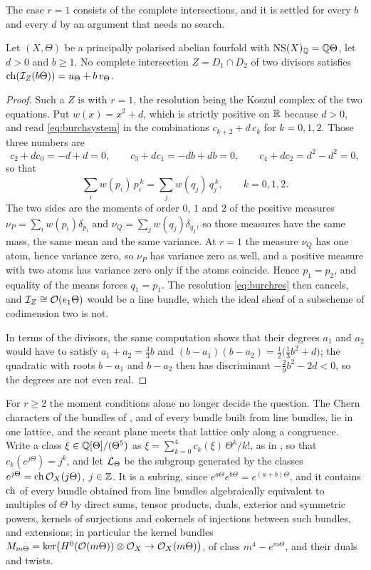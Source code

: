 The case $r=1$ consists of the complete intersections, and it is settled for
every $b$ and every $d$ by an argument that needs no search.

\begin{theorem}%
\label{thm:noci}
Let $(X,\Theta)$ be a principally polarised abelian fourfold with
$\mathrm{NS}(X)_{\mathbb{Q}}=\mathbb{Q}\Theta$, let $d>0$ and $b\ge1$. No complete intersection
$Z=D_{1}\cap D_{2}$ of two divisors satisfies
$\operatorname{ch}(\mathcal{I}_{Z}(b\Theta))=u_{\Theta}+b\,v_{\Theta}$.
\end{theorem}

\begin{proof}
Such a $Z$ is  with $r=1$, the resolution being the Koszul
complex of the two equations. Put $w(x)=x^{2}+d$, which is strictly positive
on $\mathbb{R}$ because $d>0$, and read \eqref{eq:burchsystem} in the combinations
$c_{k+2}+d\,c_{k}$ for $k=0,1,2$. Those three numbers are
\[
  c_{2}+dc_{0}=-d+d=0,\qquad
  c_{3}+dc_{1}=-db+db=0,\qquad
  c_{4}+dc_{2}=d^{2}-d^{2}=0,
\]
so that
\[
  \sum_{i}w(p_{i})\,p_{i}^{\,k}=\sum_{j}w(q_{j})\,q_{j}^{\,k},
  \qquad k=0,1,2 .
\]
The two sides are the moments of order $0$, $1$ and $2$ of the positive
measures $\nu_{P}=\sum_{i}w(p_{i})\delta_{p_{i}}$ and
$\nu_{Q}=\sum_{j}w(q_{j})\delta_{q_{j}}$, so those measures have the same
mass, the same mean and the same variance. At $r=1$ the measure $\nu_{Q}$ has
one atom, hence variance zero, so $\nu_{P}$ has variance zero as well, and a
positive measure with two atoms has variance zero only if the atoms coincide.
Hence $p_{1}=p_{2}$, and equality of the means forces $q_{1}=p_{1}$. The
resolution \eqref{eq:burchres} then cancels, and $\mathcal{I}_{Z}\cong\mathcal{O}(e_{1}\Theta)$
would be a line bundle, which the ideal sheaf of a subscheme of codimension
two is not.

In terms of the divisors, the same computation shows that their degrees
$a_{1}$ and $a_{2}$ would have to satisfy $a_{1}+a_{2}=\tfrac43b$ and
$(b-a_{1})(b-a_{2})=\tfrac12\bigl(\tfrac13b^{2}+d\bigr)$; the quadratic with
roots $b-a_{1}$ and $b-a_{2}$ then has discriminant $-\tfrac29b^{2}-2d<0$, so
the degrees are not even real.
\end{proof}

For $r\ge2$ the moment conditions alone no longer decide the question. The
Chern characters of the bundles of , and of every bundle
built from line bundles, lie in one lattice, and the secant plane meets that
lattice only along a congruence. Write a class $\xi\in\mathbb{Q}[\Theta]/(\Theta^{5})$
as $\xi=\sum_{k=0}^{4}c_{k}(\xi)\,\Theta^{k}/k!$, as in
, so that $c_{k}(e^{j\Theta})=j^{k}$, and let
$\mathcal{L}_{\Theta}$ be the subgroup generated by the classes
$e^{j\Theta}=\operatorname{ch}\mathcal{O}_{X}(j\Theta)$, $j\in\mathbb{Z}$. It is a subring, since
$e^{a\Theta}e^{b\Theta}=e^{(a+b)\Theta}$, and it contains $\operatorname{ch}$ of every
bundle obtained from line bundles algebraically equivalent to multiples of
$\Theta$ by direct sums, tensor products, duals, exterior and symmetric
powers, kernels of surjections and cokernels of injections between such
bundles, and extensions;
in particular the kernel bundles
$M_{m\Theta}=\ker\bigl(H^{0}(\mathcal{O}(m\Theta))\otimes\mathcal{O}_{X}\to\mathcal{O}_{X}(m\Theta)\bigr)$,
of class $m^{4}-e^{m\Theta}$, and their duals and twists.

